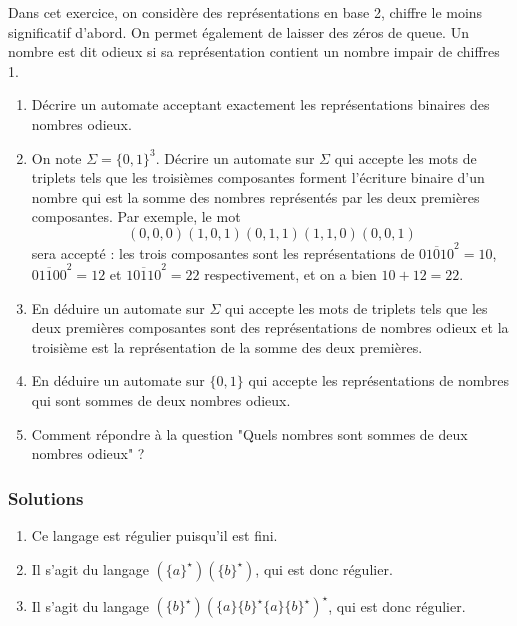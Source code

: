 \begin{exo}
Dans cet exercice, on considère des représentations en base 2, chiffre le moins significatif d'abord. On permet également de laisser des zéros de queue. Un nombre est dit odieux si sa représentation contient un nombre impair de chiffres 1.

\begin{enumerate}
\item Décrire un automate acceptant exactement les représentations binaires des nombres odieux.
\item On note $\Sigma = \{0, 1\}^3$. Décrire un automate sur $\Sigma$ qui accepte les mots de triplets tels que les troisièmes composantes forment l'écriture binaire d'un nombre qui est la somme des nombres représentés par les deux premières composantes. Par exemple, le mot
$$(0, 0, 0)(1, 0, 1)(0, 1, 1)(1, 1, 0)(0, 0, 1)$$
sera accepté : les trois composantes sont les représentations de $\overline{01010}^2 = 10$, $\overline{01100}^2 = 12$ et $\overline{10110}^2 = 22$ respectivement, et on a bien $10 + 12 = 22$.
\item En déduire un automate sur $\Sigma$ qui accepte les mots de triplets tels que les deux premières composantes sont des représentations de nombres odieux et la troisième est la représentation de la somme des deux premières.
\item En déduire un automate sur $\{0, 1\}$ qui accepte les représentations de nombres qui sont sommes de deux nombres odieux.
\item Comment répondre à la question "Quels nombres sont sommes de deux nombres odieux" ?
\end{enumerate}
\end{exo}


\subsubsection{Solutions}


\begin{sol}
\begin{enumerate}
\item Ce langage est régulier puisqu'il est fini.
\item Il s'agit du langage $(\{a\}^\star)(\{b\}^\star)$, qui est donc régulier.
\item Il s'agit du langage $(\{b\}^\star)(\{a\}\{b\}^\star\{a\}\{b\}^\star)^\star$, qui est donc régulier.
\end{enumerate}
\end{sol}


